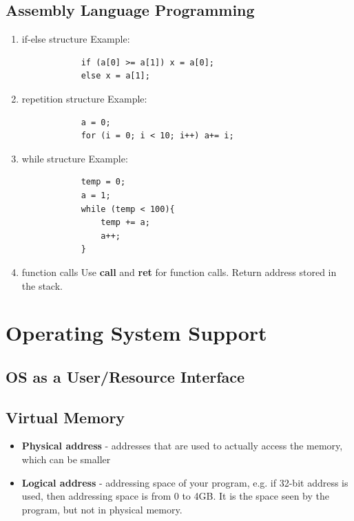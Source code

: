 \documentclass[11pt,a4paper]{article}
\begin{document}
\subsection{Assembly Language Programming}
\begin{enumerate}
    \item [1. ] if-else structure
        Example: \par
        \begin{verbatim}
            if (a[0] >= a[1]) x = a[0];
            else x = a[1];
        \end{verbatim}

    \item [2. ] repetition structure
        Example: \par
        \begin{verbatim}
            a = 0;
            for (i = 0; i < 10; i++) a+= i;
        \end{verbatim}

    \item [3. ] while structure
        Example: \par
        \begin{verbatim}
            temp = 0;
            a = 1;
            while (temp < 100){
                temp += a;
                a++;
            }
        \end{verbatim}
    
    \item [4.] function calls
        Use \textbf{call} and \textbf{ret} for function calls. Return address stored in the stack. \par

\end{enumerate}

\section{Operating System Support}
\subsection{OS as a User/Resource Interface}

\subsection{Virtual Memory}
\begin{itemize}
    \item \textbf{Physical address} - addresses that are used to actually access the memory, which can be smaller
    \item \textbf{Logical address} - addressing space of your program, e.g. if 32-bit address is used, then addressing space is from 0 to 4GB. It is the space seen by the program, but not in physical memory.
\end{itemize}
\end{document}
